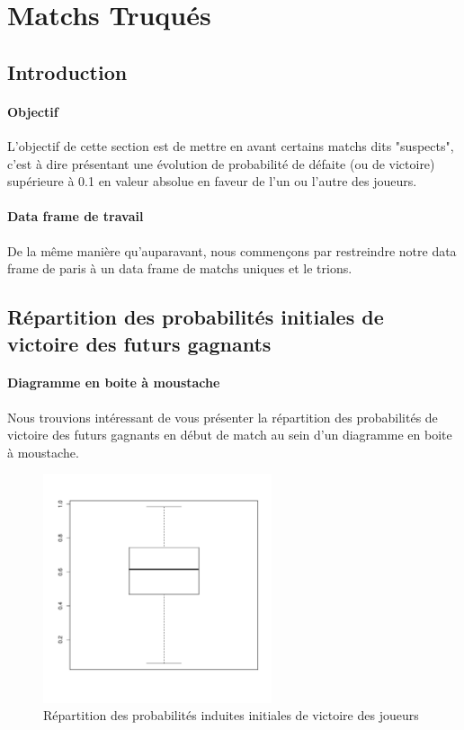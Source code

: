 \documentclass{report}
\begin{document}
\section{Matchs Truqués}
\subsection{Introduction}
\paragraph{Objectif}
L'objectif de cette section est de mettre en avant certains matchs dits
"suspects", c'est à dire présentant une évolution de probabilité de défaite (ou
de victoire) supérieure à 0.1 en
valeur absolue en faveur de l'un ou l'autre des joueurs.
\paragraph{Data frame de travail}
De la même manière qu'auparavant, nous commençons par restreindre notre data frame de paris à un data frame de matchs uniques et le trions.
\subsection{Répartition des probabilités initiales de victoire des futurs gagnants}
\paragraph{Diagramme en boite à moustache}
Nous trouvions intéressant de vous présenter la répartition des probabilités de
victoire des futurs gagnants en début de match au sein d'un diagramme en boite à moustache.
\begin{figure}[h!]
\begin{center}
    \includegraphics[width=0.6\textwidth]{boxplot2.pdf}
    \caption{Répartition des probabilités induites initiales de victoire des joueurs}
\end{center}
\end{figure}
\end{document}
